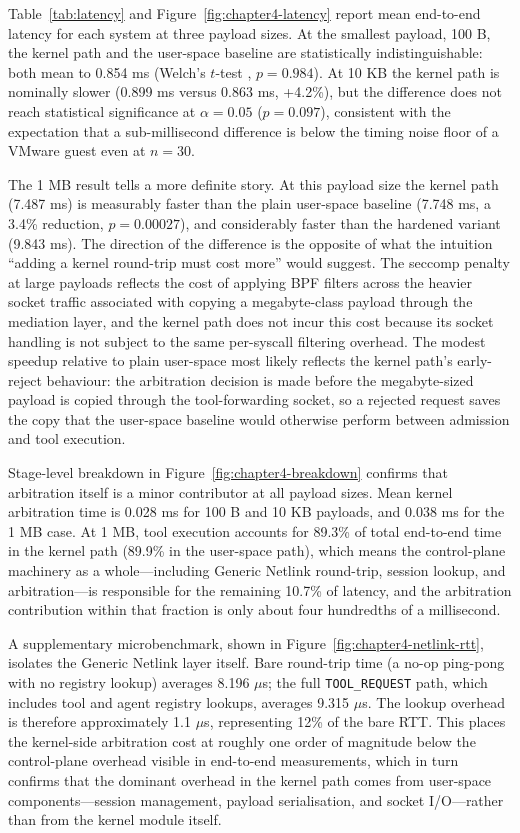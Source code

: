 Table~\ref{tab:latency} and Figure~\ref{fig:chapter4-latency} report mean end-to-end latency for each system at three payload sizes. At the smallest payload, 100 B, the kernel path and the user-space baseline are statistically indistinguishable: both mean to \num{0.854} ms (Welch's $t$-test \cite{welch1947}, $p = 0.984$). At 10 KB the kernel path is nominally slower (\num{0.899} ms versus \num{0.863} ms, +4.2\%), but the difference does not reach statistical significance at $\alpha = 0.05$ ($p = 0.097$), consistent with the expectation that a sub-millisecond difference is below the timing noise floor of a VMware guest even at $n = 30$.

The 1 MB result tells a more definite story. At this payload size the kernel path (\num{7.487} ms) is measurably faster than the plain user-space baseline (\num{7.748} ms, a 3.4\% reduction, $p = 0.00027$), and considerably faster than the hardened variant (\num{9.843} ms). The direction of the difference is the opposite of what the intuition ``adding a kernel round-trip must cost more'' would suggest. The seccomp penalty at large payloads reflects the cost of applying BPF filters across the heavier socket traffic associated with copying a megabyte-class payload through the mediation layer, and the kernel path does not incur this cost because its socket handling is not subject to the same per-syscall filtering overhead. The modest speedup relative to plain user-space most likely reflects the kernel path's early-reject behaviour: the arbitration decision is made before the megabyte-sized payload is copied through the tool-forwarding socket, so a rejected request saves the copy that the user-space baseline would otherwise perform between admission and tool execution.

Stage-level breakdown in Figure~\ref{fig:chapter4-breakdown} confirms that arbitration itself is a minor contributor at all payload sizes. Mean kernel arbitration time is \num{0.028} ms for 100 B and 10 KB payloads, and \num{0.038} ms for the 1 MB case. At 1 MB, tool execution accounts for \num{89.3}\% of total end-to-end time in the kernel path (\num{89.9}\% in the user-space path), which means the control-plane machinery as a whole---including Generic Netlink round-trip, session lookup, and arbitration---is responsible for the remaining \num{10.7}\% of latency, and the arbitration contribution within that fraction is only about four hundredths of a millisecond.

A supplementary microbenchmark, shown in Figure~\ref{fig:chapter4-netlink-rtt}, isolates the Generic Netlink layer itself. Bare round-trip time (a no-op ping-pong with no registry lookup) averages \num{8.196} $\mu$s; the full \texttt{TOOL\_REQUEST} path, which includes tool and agent registry lookups, averages \num{9.315} $\mu$s. The lookup overhead is therefore approximately \num{1.1} $\mu$s, representing 12\% of the bare RTT. This places the kernel-side arbitration cost at roughly one order of magnitude below the control-plane overhead visible in end-to-end measurements, which in turn confirms that the dominant overhead in the kernel path comes from user-space components---session management, payload serialisation, and socket I/O---rather than from the kernel module itself.


